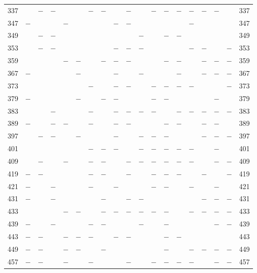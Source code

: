 \begin{center}
\begin{tabular}{r|c|c|c|c|c|c|c|c|c|c|c|c|c|c|c|c|c|r}
337 &  & $-$ & $-$ &  &  & $-$ & $-$ &  & $-$ &  & $-$ & $-$ & $-$ & $-$ & $-$ & $-$ &  & 337\\
347 & $-$ &  &  & $-$ &  &  &  & $-$ & $-$ &  &  &  &  & $-$ &  &  &  & 347\\
349 &  & $-$ & $-$ &  &  &  &  &  &  & $-$ &  & $-$ & $-$ &  &  &  &  & 349\\
353 &  & $-$ & $-$ &  &  &  &  & $-$ & $-$ & $-$ &  &  &  & $-$ & $-$ &  & $-$ & 353\\
359 &  &  &  & $-$ & $-$ &  & $-$ & $-$ & $-$ &  &  & $-$ & $-$ &  & $-$ & $-$ & $-$ & 359\\
367 & $-$ &  &  &  & $-$ &  &  & $-$ &  & $-$ &  &  & $-$ &  & $-$ & $-$ & $-$ & 367\\
373 &  &  &  &  &  & $-$ &  & $-$ & $-$ &  & $-$ & $-$ & $-$ & $-$ &  &  & $-$ & 373\\
379 & $-$ &  &  &  & $-$ &  & $-$ & $-$ &  &  & $-$ & $-$ &  &  &  & $-$ &  & 379\\
383 &  &  & $-$ &  &  & $-$ &  & $-$ & $-$ & $-$ & $-$ &  & $-$ & $-$ & $-$ & $-$ & $-$ & 383\\
389 & $-$ &  & $-$ & $-$ &  & $-$ &  & $-$ & $-$ &  &  & $-$ & $-$ &  & $-$ & $-$ &  & 389\\
397 &  & $-$ & $-$ &  & $-$ &  &  & $-$ &  & $-$ & $-$ & $-$ &  &  & $-$ & $-$ & $-$ & 397\\
401 &  &  &  &  &  & $-$ & $-$ & $-$ &  & $-$ & $-$ & $-$ & $-$ & $-$ &  & $-$ &  & 401\\
409 &  & $-$ &  & $-$ &  & $-$ & $-$ &  & $-$ & $-$ & $-$ & $-$ & $-$ & $-$ &  & $-$ & $-$ & 409\\
419 & $-$ & $-$ &  &  &  & $-$ & $-$ &  & $-$ &  & $-$ & $-$ & $-$ &  & $-$ &  & $-$ & 419\\
421 & $-$ &  & $-$ &  &  & $-$ &  & $-$ &  &  & $-$ & $-$ &  & $-$ &  & $-$ &  & 421\\
431 & $-$ &  & $-$ &  &  &  & $-$ &  & $-$ & $-$ &  &  &  &  & $-$ & $-$ & $-$ & 431\\
433 &  &  &  & $-$ & $-$ &  & $-$ & $-$ & $-$ & $-$ & $-$ & $-$ &  & $-$ & $-$ & $-$ & $-$ & 433\\
439 & $-$ &  & $-$ &  &  & $-$ & $-$ &  &  & $-$ &  & $-$ &  &  &  & $-$ & $-$ & 439\\
443 & $-$ & $-$ &  & $-$ & $-$ & $-$ &  & $-$ & $-$ &  &  & $-$ & $-$ &  &  &  &  & 443\\
449 & $-$ & $-$ &  & $-$ & $-$ &  & $-$ &  &  &  &  & $-$ &  & $-$ & $-$ & $-$ & $-$ & 449\\
457 & $-$ & $-$ &  & $-$ &  & $-$ &  &  & $-$ &  & $-$ & $-$ & $-$ & $-$ &  & $-$ & $-$ & 457\\

\end{tabular}
\end{center}
